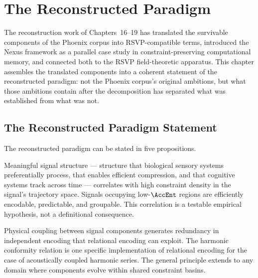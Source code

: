 
\chapter{The Reconstructed Paradigm}
\label{ch:reconstructed-paradigm}


\noindent
The reconstruction work of Chapters~16--19 has translated
the survivable components of the Phoenix corpus into
RSVP-compatible terms, introduced the Nexus framework
as a parallel case study in constraint-preserving
computational memory, and connected both to the RSVP
field-theoretic apparatus. This chapter assembles
the translated components into a coherent statement
of the reconstructed paradigm: not the Phoenix corpus's
original ambitions, but what those ambitions contain
after the decomposition has separated what was
established from what was not.

\section{The Reconstructed Paradigm Statement}
\label{sec:paradigm-statement}

The reconstructed paradigm can be stated in five propositions.

\begin{proposition}
\label{prop:constraint-density}
Meaningful signal structure --- structure that biological
sensory systems preferentially process, that enables
efficient compression, and that cognitive systems track
across time --- correlates with high constraint density
in the signal's trajectory space. Signals occupying
low-$\AccEnt$ regions are efficiently encodable,
predictable, and groupable. This correlation is a
testable empirical hypothesis, not a definitional
consequence.
\end{proposition}

\begin{proposition}
\label{prop:relational-encoding}
Physical coupling between signal components generates
redundancy in independent encoding that relational
encoding can exploit. The harmonic conformity relation
is one specific implementation of relational encoding
for the case of acoustically coupled harmonic series.
The general principle extends to any domain where
components evolve within shared constraint basins.
\end{proposition}

